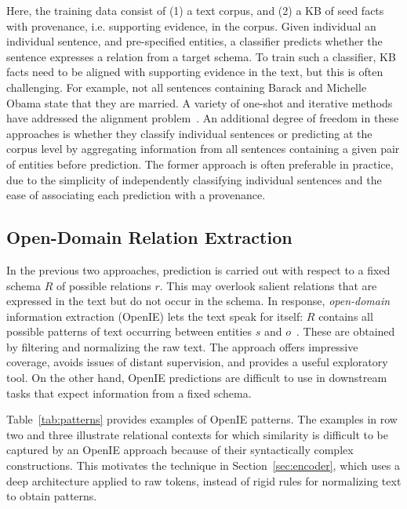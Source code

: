 Here, the training data consist of (1) a text corpus, and (2) a KB of seed facts with provenance, i.e. supporting evidence, in the corpus. Given individual an individual sentence, and pre-specified entities, a classifier predicts whether the sentence expresses a relation from a target schema. To train such a classifier, KB facts need to be aligned with supporting evidence in the text, but this is often challenging. For example, not all sentences containing Barack and Michelle Obama state that they are married. A variety of one-shot and iterative methods have addressed the alignment problem~\citep{bunescu2007learning,distant_supervision,riedel2010modeling,yao2010collective,hoffmann2011knowledge,surdeanu2012multi,min2013distant,zengdistant}.
An additional degree of freedom in these approaches is whether they classify individual sentences or predicting at the corpus level by aggregating information from all sentences containing a given pair of entities before prediction. The former approach is often preferable in practice, due to the simplicity of independently classifying individual sentences and the ease of associating each prediction with a provenance.

\subsection{Open-Domain Relation Extraction}
\label{sec:openIE}
In the previous two approaches, prediction is carried out with respect to a fixed schema $R$ of possible relations $r$. This may overlook salient relations that are expressed in the text but do not occur in the schema. In response, \textit{open-domain} information extraction (OpenIE) lets the text speak for itself: $R$ contains all possible patterns of text occurring between entities $s$ and $o$~\citep{openie,etzioni2008open,resolver}. These are obtained by filtering and normalizing the raw text. The approach offers impressive coverage, avoids issues of distant supervision, and provides a useful exploratory tool. On the other hand, OpenIE predictions are difficult to use in downstream tasks that expect information from a fixed schema. 

Table~\ref{tab:patterns} provides examples of OpenIE patterns. The examples in row two and three illustrate relational contexts for which similarity is difficult to be captured by an OpenIE approach because of their syntactically complex constructions. This motivates the technique in Section~\ref{sec:encoder}, which uses a deep architecture applied to raw tokens, instead of rigid rules for normalizing text to obtain patterns.

